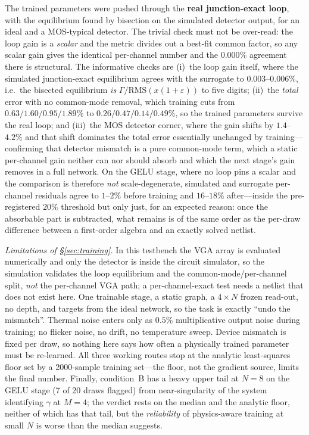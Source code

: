 \documentclass[11pt]{article}
\begin{document}
The trained parameters were pushed through the \textbf{real junction-exact loop}, with the equilibrium found by bisection on the simulated detector output, for an ideal and a MOS-typical detector. The trivial check must not be over-read: the loop gain is a \textit{scalar} and the metric divides out a best-fit common factor, so any scalar gain gives the identical per-channel number and the $0.000\%$ agreement there is structural. The informative checks are (i)~the loop gain itself, where the simulated junction-exact equilibrium agrees with the surrogate to $\mathbf{0.003}$--$\mathbf{0.006\%}$, i.e.\ the bisected equilibrium \textit{is} $\Gamma/\mathrm{RMS}(x(1+\varepsilon))$ to five digits; (ii)~the \textit{total} error with no common-mode removal, which training cuts from $0.63/1.60/0.95/1.89\%$ to $0.26/0.47/0.14/0.49\%$, so the trained parameters survive the real loop; and (iii)~the MOS detector corner, where the gain shifts by $1.4$--$4.2\%$ and that shift dominates the total error essentially unchanged by training---confirming that detector mismatch is a pure common-mode term, which a static per-channel gain neither can nor should absorb and which the next stage's gain removes in a full network. On the GELU stage, where no loop pins a scalar and the comparison is therefore \textit{not} scale-degenerate, simulated and surrogate per-channel residuals agree to $1$--$2\%$ before training and $16$--$18\%$ after---inside the pre-registered $20\%$ threshold but only just, for an expected reason: once the absorbable part is subtracted, what remains is of the same order as the per-draw difference between a first-order algebra and an exactly solved netlist.

\textit{Limitations of \S\ref{sec:training}.} In this testbench the VGA array is evaluated numerically and only the detector is inside the circuit simulator, so the simulation validates the loop equilibrium and the common-mode/per-channel split, \textit{not} the per-channel VGA path; a per-channel-exact test needs a netlist that does not exist here. One trainable stage, a static graph, a $4\times N$ frozen read-out, no depth, and targets from the ideal network, so the task is exactly ``undo the mismatch''. Thermal noise enters only as $0.5\%$ multiplicative output noise during training; no flicker noise, no drift, no temperature sweep. Device mismatch is fixed per draw, so nothing here says how often a physically trained parameter must be re-learned. All three working routes stop at the analytic least-squares floor set by a 2000-sample training set---the floor, not the gradient source, limits the final number. Finally, condition~B has a heavy upper tail at $N=8$ on the GELU stage (7 of 20 draws flagged) from near-singularity of the system identifying $\gamma$ at $M=4$; the verdict rests on the median and the analytic floor, neither of which has that tail, but the \textit{reliability} of physics-aware training at small $N$ is worse than the median suggests.
\end{document}
